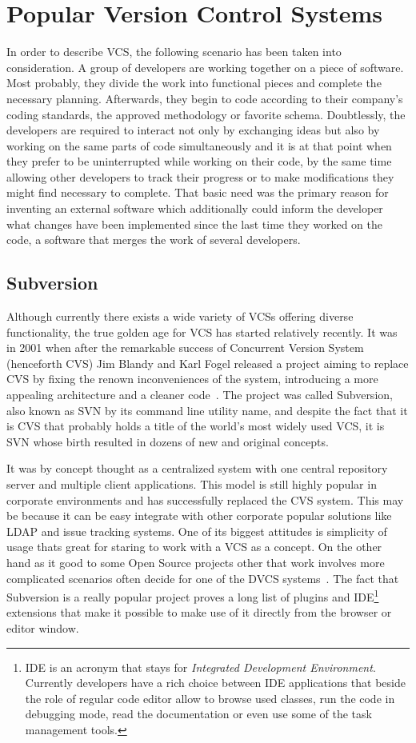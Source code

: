 \section{Popular Version Control Systems}\label{sec:popular_vcs}
In order to describe VCS, the following scenario has been taken into consideration. A group of developers are working together on a piece of software. Most probably, they divide the work into functional pieces and complete the necessary planning. Afterwards, they begin to code according to their company's coding standards, the approved methodology or favorite schema. Doubtlessly, the developers are required to interact not only by exchanging ideas but also by working on the same parts of code simultaneously and it is at that point when they prefer to be uninterrupted while working on their code, by the same time allowing other developers to track their progress or to make modifications they might find necessary to complete. That basic need was the primary reason for inventing an external software which additionally could inform the developer what changes have been implemented since the last time they worked on the code, a software that merges the work of several developers. 

\subsection{Subversion}\label{subsec:svn}
Although currently there exists a wide variety of VCSs offering diverse functionality, the true golden age for VCS has started relatively recently. It was in 2001 when after the remarkable success of Concurrent Version System (henceforth CVS) Jim Blandy and Karl Fogel released a project aiming to replace CVS by fixing the renown inconveniences of the system, introducing a more appealing architecture and a cleaner code~\cite[page 11]{hg_book}. The project was called Subversion, also known as SVN by its command line utility name, and despite the fact that it is CVS that probably holds a title of the world's most widely used VCS, it is SVN whose birth resulted in dozens of new and original concepts.

It was by concept thought as a centralized system with one central repository server and multiple client applications. This model is still highly popular in corporate environments and has successfully replaced the CVS system. This may be because it can be easy integrate with other corporate popular solutions like LDAP and issue tracking systems. One of its biggest attitudes is simplicity of usage thats great for staring to work with a VCS as a concept. On the other hand as it good to some Open Source projects other that work involves more complicated scenarios often decide for one of the DVCS systems~\cite{linus_subversion}. The fact that Subversion is a really popular project proves a long list of plugins and IDE\footnote{IDE is an acronym that stays for \textit{Integrated Development Environment}. Currently developers have a rich choice between IDE applications that beside the role of regular code editor allow to browse used classes, run the code in debugging mode, read the documentation or even use some of the task management tools.} extensions that make it possible to make use of it directly from the browser or editor window.  

